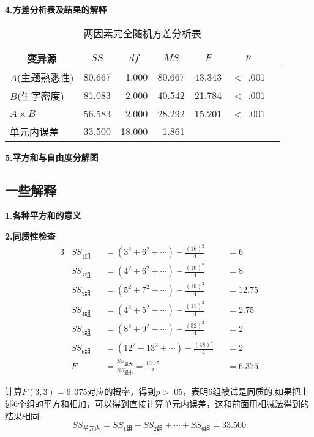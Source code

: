 \textbf{4.方差分析表及结果的解释}


\begin{table}[htbp]
	\centering
	\caption{两因素完全随机方差分析表}
	{
		\begin{tabular}{lrrrrrr}
			\toprule
			\multicolumn{1}{c}{变异源} & \multicolumn{1}{c}{$SS$} & \multicolumn{1}{c}{$df$} & \multicolumn{1}{c}{$MS$} & \multicolumn{1}{c}{$F$} & \multicolumn{1}{c}{$p$} \\
			\midrule
			$A$(主题熟悉性) & 80.667 & 1.000 & 80.667 & 43.343 & $<$ .001  \\
			$B$(生字密度) & 81.083 & 2.000 & 40.542 & 21.784 & $<$ .001  \\
			$A \times B$ & 56.583 & 2.000 & 28.292 & 15.201 & $<$ .001  \\
			单元内误差 & 33.500 & 18.000 & 1.861 &  &    \\
			\bottomrule
		\end{tabular}
	}
\end{table}


\textbf{5.平方和与自由度分解图}

\subsection{一些解释}
\textbf{1.各种平方和的意义}

\textbf{2.同质性检查}
\begin{alignat*}{3}
    & SS_{\text{1组}} &&= \left( 3^2+6^2+\cdots \right) -\frac{\left( 16 \right) ^2}{4}    &&=    6\\
    & SS_{\text{2组}} &&= \left( 4^2+6^2+\cdots \right) -\frac{\left( 16 \right) ^2}{4}    &&=    8\\
    & SS_{\text{3组}} &&= \left( 5^2+7^2+\cdots \right) -\frac{\left( 19 \right) ^2}{4}    &&=    12.75\\
    & SS_{\text{4组}} &&= \left( 4^2+5^2+\cdots \right) -\frac{\left( 15 \right) ^2}{4}    &&=    2.75\\
    & SS_{\text{5组}} &&= \left( 8^2+9^2+\cdots \right) -\frac{\left( 32 \right) ^2}{4}    &&=    2\\
    & SS_{\text{6组}} &&= \left( 12^2+13^2+\cdots \right) -\frac{\left( 48 \right) ^2}{4}  &&=    2\\
    & F               &&=\frac{SS_{\text{最大}}}{SS_{\text{最小}}}=\frac{12.75}{2}         &&=6.375
\end{alignat*}

计算$F(3,3)=6,375$对应的概率，得到$p>.05$，表明6组被试是同质的.如果把上述6个组的平方和相加，可以得到直接计算单元内误差，这和前面用相减法得到的结果相同.
\[ SS_{\text{单元内}} = SS_{\text{1组}}+SS_{\text{2组}}+\cdots+SS_{\text{6组}}=33.500 \]